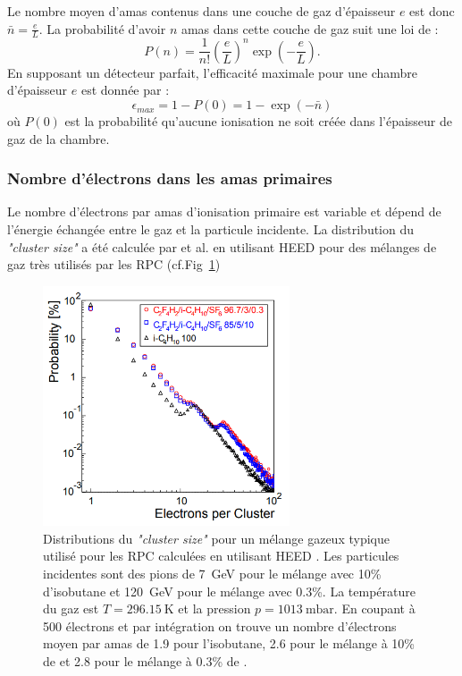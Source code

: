 Le nombre moyen d'amas contenus dans une couche de gaz d'épaisseur $e$ est donc $\bar{n}=\frac{e}{L}$. La probabilité d'avoir $n$ amas dans cette couche de gaz suit une loi de  :
\begin{equation}
P(n)=\frac{1}{n!}\left(\frac{e}{L}\right)^{n}\exp\left(-\frac{e}{L}\right).
\end{equation}
En supposant un détecteur parfait, l'efficacité maximale pour une chambre d'épaisseur $e$ est donnée par :
\begin{equation}
\epsilon_{max}=1-P(0)=1-\exp\left(-\bar{n}\right)
\end{equation}
où $P(0)$ est la probabilité qu'aucune ionisation ne soit créée dans l'épaisseur de gaz de la chambre.

\subsubsection{Nombre d'électrons dans les amas primaires}
Le nombre d'électrons par amas d'ionisation primaire est variable et dépend de l'énergie échangée entre le gaz et la particule incidente. La distribution du \textit{"cluster size"} a été calculée par  et al. \cite{Riegler:570462} en utilisant HEED pour des mélanges de gaz très utilisés par les RPC (cf.Fig~\ref{cluster})
\begin{figure}[ht!]
	\centering
	\includegraphics[width=0.65\textwidth]{RPC/cluster.png}
	\captionsetup{type=figure}\caption{Distributions du \textit{"cluster size"} pour un mélange gazeux typique utilisé pour les RPC calculées en utilisant HEED \cite{HEED}. Les particules incidentes sont des pions de \SI{7}{\giga\eV} pour le mélange avec \num{10}\% d'isobutane et \SI{120}{\giga\eV} pour le mélange avec \num{0.3}\%. La température du gaz est $T=\SI{296.15}{\kelvin}$ et la pression $p=\SI{1013}{\milli\bar}$. En coupant à \num{500} électrons et par intégration on trouve un nombre d'électrons moyen par amas de \num{1.9} pour l'isobutane, \num{2.6} pour le mélange à \num{10}\% de  et \num{2.8} pour le mélange à \num{0.3}\% de .}
	\label{cluster}
\end{figure}

